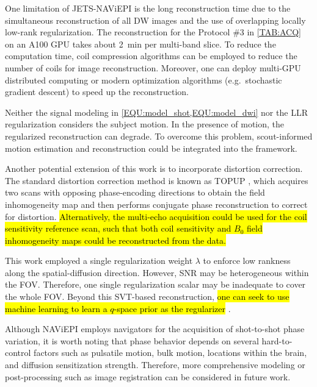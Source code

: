 \documentclass[preprint,12pt,authoryear,review]{elsarticle}
\begin{document}
    One limitation of JETS-NAViEPI is the long reconstruction time
    due to the simultaneous reconstruction of all DW images and
    the use of overlapping locally low-rank regularization.
    The reconstruction for the Protocol \#3 in \cref{TAB:ACQ}
    on an A100 GPU takes about \SI{2}{\minute} per multi-band slice.
    To reduce the computation time, coil compression algorithms
    \citep{buehrer_2007_scc,huang_2008_scc}
    can be employed to reduce the number of coils for image reconstruction.
    Moreover, one can deploy multi-GPU distributed computing
    or modern optimization algorithms
    (e.g.~stochastic gradient descent) \citep{ong_2020_extreme}
    to speed up the reconstruction.

    Neither the signal modeling in
    \cref{EQU:model_shot,EQU:model_dwi}
    nor the LLR regularization considers the subject motion.
    In the presence of motion, the regularized reconstruction can degrade.
    To overcome this problem, scout-informed motion estimation
    and reconstruction \citep{polak_2022_samer}
    could be integrated into the framework.

    Another potential extension of this work is
    to incorporate distortion correction.
    The standard distortion correction method is
    known as TOPUP \citep{andersson_2003_topup},
    which acquires two scans
    with opposing phase-encoding directions to
    obtain the field inhomogeneity map and
    then performs conjugate phase reconstruction
    to correct for distortion.
    \hl{Alternatively, the multi-echo acquisition could be used
    for the coil sensitivity reference scan, such that
    both coil sensitivity and $B_0$ field inhomogeneity maps
    could be reconstructed from the data.}

    This work employed a single regularization weight $\lambda$
    to enforce low rankness along the spatial-diffusion direction.
    However, SNR may be heterogeneous within the FOV.
    Therefore, one single regularization scalar may be inadequate
    to cover the whole FOV.
    Beyond this SVT-based reconstruction,
    \hl{one can seek to use machine learning to
    learn a $q$-space prior as the regularizer}
    \citep{hammernik_2018_varnet,lam_2019_mrsi,mani_2021_qmodel}.

    Although NAViEPI employs navigators for
    the acquisition of shot-to-shot phase variation,
    it is worth noting that phase behavior depends on
    several hard-to-control factors
    such as pulsatile motion, bulk motion,
    locations within the brain, and
    diffusion sensitization strength.
    Therefore, more comprehensive modeling or post-processing
    such as image registration can be considered in future work.
\end{document}
